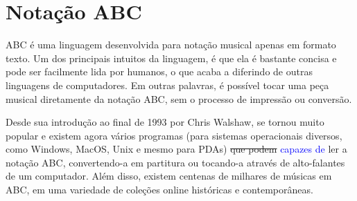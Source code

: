 \documentclass{automatextcc}
\newcommand{\pumi}[1]{\textcolor{blue}{#1}}
\begin{document}





\section{Notação ABC}

ABC é uma linguagem desenvolvida para notação musical apenas em formato texto. Um dos principais intuitos da linguagem, é que ela é bastante concisa e pode ser facilmente lida por humanos,  o que acaba a diferindo de outras linguagens de computadores. Em outras palavras, é possível tocar uma peça musical diretamente da notação ABC, sem o processo de impressão ou conversão. 

Desde sua introdução ao final de 1993 por Chris Walshaw, se tornou muito popular e existem agora vários programas (para sistemas operacionais diversos, como Windows, MacOS, Unix e mesmo para PDAs) \sout{que podem} \pumi{capazes de} ler a notação ABC, convertendo-a em partitura ou tocando-a através de alto-falantes de um computador. Além disso, existem centenas de milhares de músicas em ABC, em uma variedade de coleções online históricas e contemporâneas.


\end{document}
